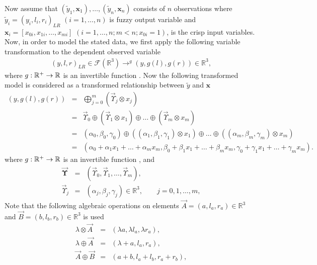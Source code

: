 \documentclass{IJFS}
\begin{document}
Now assume that
$(\widetilde{y}_1,\boldsymbol{x}_1),\ldots,(\widetilde{y}_n,\boldsymbol{x}_n)$ consists of $n$ observations
where
$\widetilde{y}_i=(y_i,l_i,r_i)_{LR}$  $(i=1,\ldots,n)$ is fuzzy output variable and
$\boldsymbol{x}_i=[x_{0i},x_{1i},\ldots,  x_{mi}]$  $(i=1,\ldots, n; m<n; x_{0i}=1)$,
is the crisp input variables.
Now, in order to model the stated data, we first apply the following variable transformation to the dependent observed  variable
\begin{eqnarray*}
  (y,l,r)_{LR} \in \mathcal{F}(\mathbb{R}^3)  \rightarrow^{g}  (y,g(l),g(r)) \in \mathbb{R}^3,
\end{eqnarray*}
where $g:\Bbb{R}^+\rightarrow\Bbb{R}$ is an invertible function  \cite{Dur00,Dur03,Dur13}.
Now the following transformed model is considered as a transformed relationship between $\widetilde{y}$ and $\boldsymbol{x}$
\begin{eqnarray}\label{M1}
(y,g(l),g(r))      &=&   \bigoplus_{j=0}^m(\vec{\Upsilon}_j\otimes x_j)\\
                   &=& \vec{\Upsilon}_0 \oplus (\vec{\Upsilon}_1 \otimes x_1) \oplus\ldots \oplus (\vec{\Upsilon}_m\otimes x_m)\nonumber\\
                   &=& (\alpha_0,\beta_0,\gamma_0) \oplus ((\alpha_1,\beta_1,\gamma_1) \otimes x_1)  \oplus \ldots\oplus ((\alpha_m,\beta_m,\gamma_m) \otimes x_m)\nonumber\\
                   &=&  (\alpha_0+\alpha_1 x_1 + \ldots + \alpha_m x_m, \beta_0+\beta_1 x_1 + \ldots + \beta_m x_m,\gamma_0+\gamma_1 x_1 + \ldots + \gamma_m x_m).\nonumber
\end{eqnarray}
where $g:\Bbb{R}^+\rightarrow\Bbb{R}$ is an invertible function  \cite{Dur00,Dur03,Dur13}, and
\begin{eqnarray*}
\vec{\boldsymbol{\Upsilon}}  &=&(\vec{\Upsilon}_0,\vec{\Upsilon}_1,\ldots,\vec{\Upsilon}_m),\\
\vec{\Upsilon}_j             &=&(\alpha_j,\beta_j,\gamma_j)\in\mathbb{R}^3, \qquad j=0,1,\ldots,m,
\end{eqnarray*}
Note that the following algebraic operations on elements
$\vec{A} = (a, l_a, r_a) \in\mathbb{R}^3$  and  $\vec{B} = (b, l_b, r_b)\in\mathbb{R}^3$ is used
\begin{eqnarray*}
    \lambda \otimes  \vec{A}        & = & (\lambda a,\lambda l_a,\lambda r_a),\\
    \lambda \oplus   \vec{A}        & = & (\lambda + a, l_a, r_a),\\
    \vec{A} \oplus   \vec{B}        & = & (a + b, l_a+l_b,r_a+r_b),
\end{eqnarray*}
\end{document}
